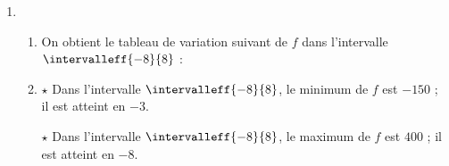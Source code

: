 \documentclass[10pt,french]{article}
\begin{document}
\begin{enumerate}[label=\arabic*.]
\item 	\begin{enumerate}[label=\alph*)]
	\item On obtient le tableau de variation suivant de $f$ dans l'intervalle $\intervalleff{-8}{8}$ :

\begin{center}
\end{center}
%
%


	
	\item %
	$\star$ Dans l'intervalle $\intervalleff{-8}{8}$, le minimum de $f$ est $-150$ ; il est atteint en $-3$.
	
	$\star$ Dans l'intervalle $\intervalleff{-8}{8}$, le maximum de $f$ est $400$ ; il est atteint en $-8$.
	\end{enumerate}

\end{enumerate}
\end{document}
